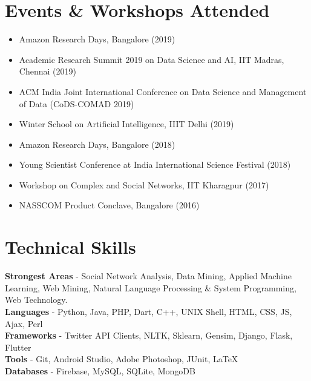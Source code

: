 \documentclass[margin, centered]{res}
\begin{document}
\begin{resume}
\section{Events \& Workshops Attended}
\begin{itemize}[leftmargin=*]
\item Amazon Research Days, Bangalore (2019)
\item Academic Research Summit 2019 on Data Science and AI, IIT Madras, Chennai (2019)
\item ACM India Joint International Conference on Data Science and Management of Data (CoDS-COMAD 2019)
\item Winter School on Artificial Intelligence, IIIT Delhi (2019)
\item Amazon Research Days, Bangalore (2018)
\item Young Scientist Conference at India International Science Festival (2018)
\item Workshop on Complex and Social Networks, IIT Kharagpur (2017)
\item NASSCOM Product Conclave, Bangalore (2016)
\end{itemize}


\section{Technical \hspace{2mm} Skills}
\textbf{Strongest Areas} - Social Network Analysis, Data Mining, Applied Machine Learning, Web Mining, Natural Language Processing \& System Programming, Web Technology.  \\
\textbf{Languages} - Python, Java, PHP, Dart, C++, UNIX Shell, HTML, CSS, JS, Ajax, Perl \\
\textbf{Frameworks} - Twitter API Clients, NLTK, Sklearn, Gensim, Django, Flask, Flutter \\
\textbf{Tools} - Git, Android Studio, Adobe Photoshop, JUnit, \LaTeX \\
\textbf{Databases} - Firebase, MySQL, SQLite, MongoDB \\



\end{resume}
\end{document}
